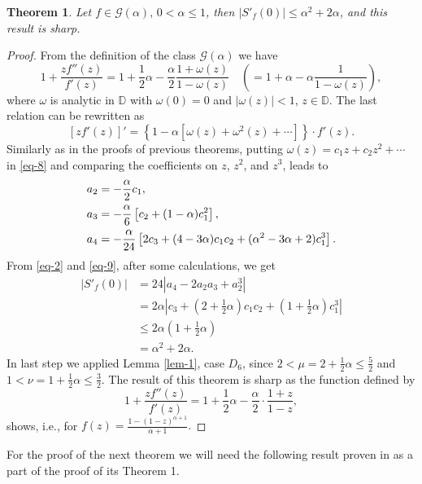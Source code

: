 \documentclass{amsart}
\newtheorem{thm}{Theorem}
\newcommand{\ID}{{\mathbb D}}
\def\be{\begin{equation}}
\def\ee{\end{equation}}
\begin{document}
\begin{thm}\label{th3}
Let $f\in\mathcal{G}(\alpha),\,0<\alpha\leq1$, then $|S'_{f}(0)|\leq \alpha^{2}+2\alpha$,
and this result is sharp.
\end{thm}

\begin{proof}
From the definition of the class $\mathcal{G}(\alpha)$ we have
\[
1+\frac{zf''(z)}{f'(z)}=1+\frac{1}{2}\alpha -\frac{\alpha}{2}\frac{1+\omega(z)}{1-\omega(z)}
\quad\left(=1+\alpha-\alpha\frac{1}{1-\omega(z)} \right),\]
where $\omega$ is analytic in $\ID$ with $\omega(0)=0$ and $|\omega(z)|<1$, $z\in\ID$.
The last relation can be rewritten as
\be\label{eq-8}
[z f'(z)]'=\left\{1-\alpha[\omega(z)+\omega^{2}(z)+\cdots]\right\}\cdot f'(z).
\ee
Similarly as in the proofs of previous theorems, putting $\omega(z)=c_{1}z+c_{2}z^{2}+\cdots$ in \eqref{eq-8} and comparing  the coefficients on $z$, $z^{2}$, and $z^{3}$, leads to
\be\label{eq-9}
\begin{split}
\displaystyle\smallskip
a_{2}&=-\frac{\alpha}{2}c_{1}, \\
a_{3}&=-\frac{\alpha}{6}\left[c_{2}+(1-\alpha) c_{1}^{2}\right],\\
a_{4}&=-\frac{\alpha}{24}\left[2c_{3}+(4-3\alpha)c_{1}c_{2}+(\alpha^{2}-3\alpha+2)c_{1}^{3}\right].
\end{split}
\ee
From \eqref{eq-2} and \eqref{eq-9}, after some calculations, we get
\[
\begin{split}
|S'_{f}(0)|&=24|a_{4}-2a_{2}a_{3}+a_{2}^{3}|\\
&=2\alpha\left|c_{3}+\left(2+\frac{1}{2}\alpha\right)c_{1}c_{2}+\left(1+\frac{1}{2}\alpha\right) c_{1}^{3}\right|\\
&\leq 2\alpha \left(1+\frac{1}{2}\alpha\right)\\
&=\alpha^{2}+2\alpha.
\end{split}
\]
In last step we applied Lemma \ref{lem-1}, case $D_{6}$, since $2<\mu=2+\frac{1}{2}\alpha\leq \frac{5}{2}$ and
$1<\nu= 1+\frac{1}{2}\alpha\leq \frac{3}{2}$. The result of this theorem is sharp as the function defined by
\[
1+\frac{zf''(z)}{f'(z)}=1+\frac{1}{2}\alpha -\frac{\alpha}{2}\cdot \frac{1+z}{1-z},
\]
shows, i.e., for $f(z)=\frac{1-(1-z)^{\alpha +1}}{\alpha +1}.$
\end{proof}


\medskip

For the proof of the next theorem we will need the following result proven in \cite{OP-2019} as a part of the proof of its Theorem 1.
\end{document}
